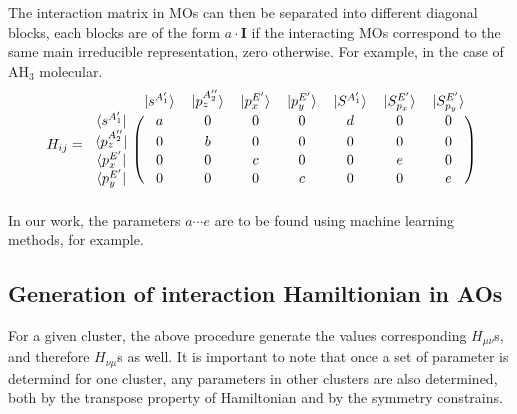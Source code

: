 \documentclass{article}
\begin{document}
The interaction matrix in MOs can then be separated into different diagonal blocks, each blocks are of the form $a\cdot \mathbf{I}$ if 
the interacting MOs correspond to the same main irreducible representation, zero otherwise.
For example, in the case of AH$_3$ molecular.
\begin{equation}
    H_{ij} = \begin{blockarray}{cccccccc}
        & |s^{A_1'}\rangle & |p_z^{A_2''}\rangle & |p_x^{E'}\rangle & |p_y^{E'}\rangle 
        & |S^{A_1'}\rangle & |S^{E'}_{p_x}\rangle & |S^{E'}_{p_y}\rangle \\
        \begin{block}{c(ccccccc)}
        \langle s^{A_1'}    |  & a & 0 & 0 & 0 & d & 0 & 0 \\
        \langle p_z^{A_2''} |  & 0 & b & 0 & 0 & 0 & 0 & 0 \\
        \langle p_x^{E'}    |  & 0 & 0 & c & 0 & 0 & e & 0 \\
        \langle p_y^{E'}    |  & 0 & 0 & 0 & c & 0 & 0 & e \\
        \end{block}
        \end{blockarray}
\end{equation}
In our work, the parameters $a \cdots e$ are to be found using machine learning methods, for example. 

\subsection{Generation of interaction Hamiltionian in AOs}
For a given cluster, the above procedure generate the values corresponding $H_{\mu\nu}$s, and 
therefore $H_{\nu\mu}$s as well. It is important to note that once a set of parameter is determind 
for one cluster, any parameters in other clusters are also determined, both by the transpose 
property of Hamiltonian and by the symmetry constrains. 
 
\end{document}
